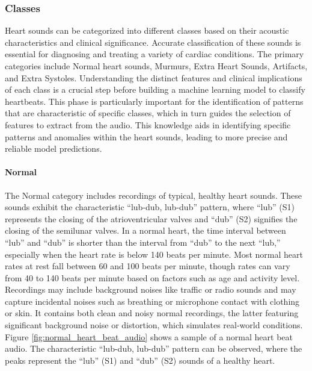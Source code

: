 \subsubsection*{Classes} %

Heart sounds can be categorized into different classes based on their acoustic characteristics and clinical significance.
Accurate classification of these sounds is essential for diagnosing and treating a variety of cardiac conditions.
The primary categories include Normal heart sounds, Murmurs, Extra Heart Sounds, Artifacts, and Extra Systoles.
Understanding the distinct features and clinical implications of each class is a crucial step before building a
machine learning model to classify heartbeats.
This phase is particularly important for the identification of patterns that are characteristic of specific classes,
which in turn guides the selection of features to extract from the audio.
This knowledge aids in identifying specific patterns and anomalies within the heart sounds,
leading to more precise and reliable model predictions.

\paragraph{Normal}
The Normal category includes recordings of typical, healthy heart sounds. These sounds exhibit the characteristic ``lub-dub, lub-dub'' pattern,
where ``lub'' (S1) represents the closing of the atrioventricular valves and ``dub'' (S2) signifies the closing of the semilunar valves.
In a normal heart, the time interval between ``lub'' and ``dub'' is shorter than the interval from ``dub'' to the next ``lub,''
especially when the heart rate is below 140 beats per minute. Most normal heart rates at rest fall between 60 and 100 beats per minute,
though rates can vary from 40 to 140 beats per minute based on factors such as age and activity level.
Recordings may include background noises like traffic or radio sounds and may capture incidental noises such as breathing or microphone
contact with clothing or skin. It contains both clean and noisy normal recordings,
the latter featuring significant background noise or distortion, which simulates real-world conditions.\\
Figure \ref{fig:normal_heart_beat_audio} shows a sample of a normal heart beat audio.
The characteristic ``lub-dub, lub-dub'' pattern can be observed, where the peaks represent the ``lub'' (S1) and ``dub'' (S2) sounds of a healthy heart.

